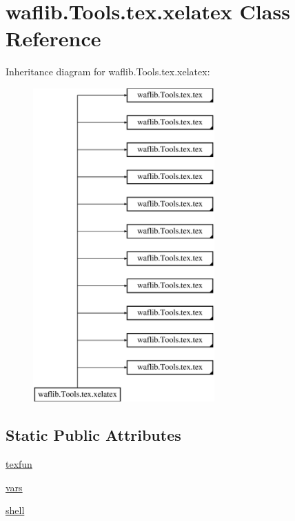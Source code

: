 \hypertarget{classwaflib_1_1_tools_1_1tex_1_1xelatex}{}\section{waflib.\+Tools.\+tex.\+xelatex Class Reference}
\label{classwaflib_1_1_tools_1_1tex_1_1xelatex}
Inheritance diagram for waflib.\+Tools.\+tex.\+xelatex\+:\begin{figure}[H]
\begin{center}
\leavevmode
\includegraphics[height=12.000000cm]{classwaflib_1_1_tools_1_1tex_1_1xelatex}
\end{center}
\end{figure}
\subsection*{Static Public Attributes}
\begin{DoxyCompactItemize}
\item 
\hyperlink{classwaflib_1_1_tools_1_1tex_1_1xelatex_adea6951f02e1b389b310035bfae0b316}{texfun}
\item 
\hyperlink{classwaflib_1_1_tools_1_1tex_1_1xelatex_a3533f624f2e10935e419d0ea244d9485}{vars}
\item 
\hyperlink{classwaflib_1_1_tools_1_1tex_1_1xelatex_a7107a73e104d27a8e57587fa96b4f5d2}{shell}
\end{DoxyCompactItemize}

